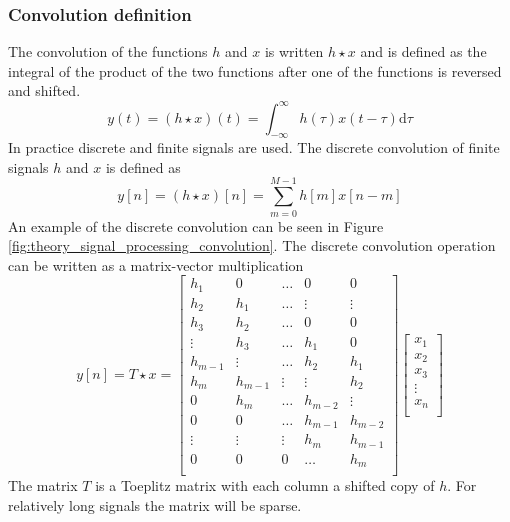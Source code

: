 \subsubsection{Convolution definition}
The convolution of the functions $h$ and $x$ is written $h \star x$ and is defined as the integral of the product of the two functions after one of the functions is reversed and shifted.
\begin{equation}
 y(t) = (h \star x)(t) = \int_{-\infty}^{\infty} h(\tau)x(t-\tau) \mathrm{d}\tau
\end{equation}
In practice discrete and finite signals are used. The discrete convolution of finite signals $h$ and $x$ is defined as
\begin{equation}\label{eq:theory_signal_processing_convolution_fir}
 y [n] = (h \star x )[n] = \sum_{m=0}^{M-1} h[m] x[n-m]
\end{equation}
An example of the discrete convolution can be seen in Figure \ref{fig:theory_signal_processing_convolution}.
The discrete convolution operation can be written as a matrix-vector multiplication
\begin{equation}\label{eq:theory_signal_processing_convolution_toeplitz}
 y [n] = T \star x =
 \begin{bmatrix}
 h_1 & 0 & \hdots & 0 & 0 \\
 h_2 & h_1 & \hdots & \vdots & \vdots \\
 h_3 & h_2 & \hdots & 0 & 0 \\
 \vdots & h_3 & \hdots & h_1 & 0 \\
 h_{m-1} & \vdots & \hdots & h_2 & h_1 \\
 h_m & h_{m-1} & \vdots & \vdots & h_2 \\
 0 & h_m & \hdots & h_{m-2} & \vdots \\
 0 & 0 & \hdots & h_{m-1} & h_{m-2} \\
 \vdots & \vdots & \vdots & h_{m} & h_{m-1} \\
 0 & 0 & 0 & \hdots & h_{m} \\
 \end{bmatrix}
 \begin{bmatrix}
  x_1 \\
  x_2 \\
  x_3 \\
  \vdots \\
  x_n \\
 \end{bmatrix}
\end{equation}
The matrix $T$ is a Toeplitz matrix with each column a shifted copy of $h$.
For relatively long signals the matrix will be sparse.

